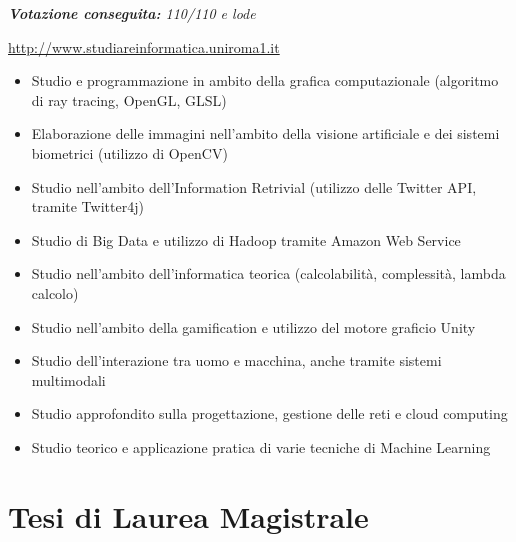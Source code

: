 \documentclass[11pt,a4paper,sans]{moderncv} %
\begin{document}
{
	\newline{}
	\textit{\textbf{Votazione conseguita:} 110/110 e lode}
}
{
	\url{http://www.studiareinformatica.uniroma1.it}
	\begin{itemize}
		\item Studio e programmazione in ambito della grafica computazionale (algoritmo di ray tracing, OpenGL, GLSL)
		\item Elaborazione delle immagini nell'ambito della visione artificiale e dei sistemi biometrici (utilizzo di OpenCV)
		\item Studio nell'ambito dell'Information Retrivial (utilizzo delle Twitter API, tramite Twitter4j)
		\item Studio di Big Data e utilizzo di Hadoop tramite Amazon Web Service
		\item Studio nell'ambito dell'informatica teorica (calcolabilit\`{a}, complessit\`{a}, lambda calcolo)
		\item Studio nell'ambito della gamification e utilizzo del motore graficio Unity
		\item Studio dell'interazione tra uomo e macchina, anche tramite sistemi multimodali
		\item Studio approfondito sulla progettazione, gestione delle reti e cloud computing
		\item Studio teorico e applicazione pratica di varie tecniche di Machine Learning
	\end{itemize}
}

\section{Tesi di Laurea Magistrale}


\end{document}
